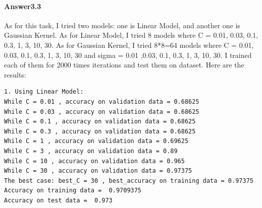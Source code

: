 \documentclass[paper=a4, fontsize=11pt]{scrartcl} %
\numberwithin{equation}{section} %
\numberwithin{figure}{section} %
\numberwithin{table}{section} %
\begin{document}
\paragraph{\textbf{Answer3.3}}
As for this task, I tried two models: one is Linear Model, and another one is Gaussian Kernel. As for Linear Model, I tried 8 models where C = 0.01, 0.03, 0.1, 0.3, 1, 3, 10, 30.
As for Gaussian Kernel, I tried 8*8=64 models where C = 0.01, 0.03, 0.1, 0.3, 1, 3, 10, 30 and sigma = 0.01 ,0.03, 0.1, 0.3, 1, 3, 10, 30. I trained each of them for 2000 times iterations and test them on dataset. Here are the results:
\begin{verbatim}
1. Using Linear Model:
While C = 0.01 , accuracy on validation data = 0.68625
While C = 0.03 , accuracy on validation data = 0.68625
While C = 0.1 , accuracy on validation data = 0.68625
While C = 0.3 , accuracy on validation data = 0.68625
While C = 1 , accuracy on validation data = 0.69625
While C = 3 , accuracy on validation data = 0.89
While C = 10 , accuracy on validation data = 0.965
While C = 30 , accuracy on validation data = 0.97375
The best case: best_C = 30 , best_accuracy on training data = 0.97375
Accuracy on training data =  0.9709375
Accuracy on test data =  0.973
\end{verbatim}
\end{document}

